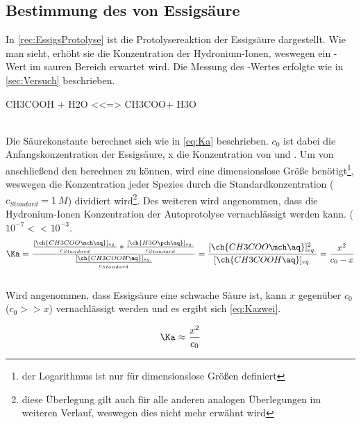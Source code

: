 \documentclass{article}
\begin{document}
    \pagebreak
    
    \subsection{Bestimmung des \pKa von Essigsäure} \label{sec:pKAEssigs}
      
      In \ref{rec:EssigsProtolyse} ist die Protolysereaktion der Essigsäure dargestellt. Wie man sieht, erhöht sie die Konzentration der Hydronium-Ionen, weswegen ein \pH-Wert im sauren Bereich erwartet wird. Die Messung des \pH-Wertes erfolgte wie in \ref{sec:Versuch} beschrieben.\\
      
      \begin{reaction}
        CH3COOH + H2O <<=> CH3COO\mch[] + H3O\pch \label{rec:EssigsProtolyse} \\
      \end{reaction} \\
      
      Die Säurekonstante \Ka berechnet sich wie in \eqref{eq:Ka} beschrieben. $c_{0}$ ist dabei die Anfangskonzentration der Essigsäure, x die Konzentration von  und . Um von \Ka anschließend den \pKa berechnen zu können, wird eine dimensionslose Größe benötigt\footnote{der Logarithmus ist nur für dimensionslose Größen definiert}, weswegen die Konzentration jeder Spezies durch die Standardkonzentration ($c_{Standard} = \SI[mode=text]{1}{M}$) dividiert wird\footnote{diese Überlegung gilt auch für alle anderen analogen Überlegungen im weiteren Verlauf, weswegen dies nicht mehr erwähnt wird}. Des weiteren wird angenommen, dass die Hydronium-Ionen Konzentration der Autoprotolyse vernachlässigt werden kann. ($10^{-7} << 10^{-3}$. \\
      
      \begin{equation}
        \Ka = \frac{\frac{[\ch{CH3COO\mch\aq}]_{eq.}}{c_{Standard}}*\frac{[\ch{H3O\pch\aq}]_{eq.}}{c_{Standard}}}{\frac{[\ch{CH3COOH\aq}]_{eq.}}{c_{Standard}}} = \frac{[\ch{CH3COO\mch\aq}]_{eq.}^2}{[\ch{CH3COOH\aq}]_{eq.}} = \frac{x^2}{c_{0}-x} \label{eq:Ka}
      \end{equation} \\
      
      Wird angenommen, dass Essigsäure eine schwache Säure ist, kann $x$ gegenüber $c_{0}$ ($c_{0} >> x$) vernachlässigt werden und es ergibt sich \eqref{eq:Kazwei}.
      
      \begin{equation}
        \Ka \approx \frac{x^2}{c_{0}} \label{eq:Kazwei}
      \end{equation}
      
\end{document}
